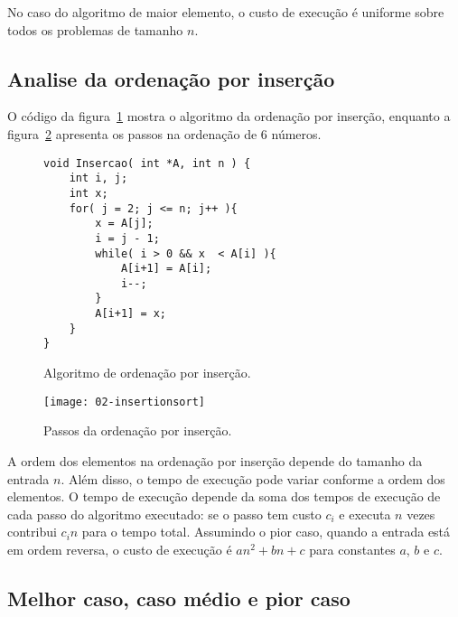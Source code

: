 No caso do algoritmo de maior elemento, o custo de execução é uniforme sobre todos os problemas 
de tamanho $n$.

\subsection{Analise da ordenação por inserção}

O código da figura~\ref{aula02:algo:insertion} mostra o algoritmo da ordenação
por inserção, enquanto a figura~\ref{aula02:fig:insertion} apresenta os passos
na ordenação de 6 números.
%
\begin{figure}[!htb]
\centering
\begin{framed}
\begin{lstlisting}
void Insercao( int *A, int n ) {
	int i, j;
	int x;
	for( j = 2; j <= n; j++ ){
		x = A[j];
		i = j - 1;
		while( i > 0 && x  < A[i] ){
			A[i+1] = A[i];
			i--;
		}
		A[i+1] = x;
	}
}
\end{lstlisting}
\end{framed}
\caption{Algoritmo de ordenação por inserção.}
\label{aula02:algo:insertion}
\end{figure}
%
\begin{figure}[ht]
\centering
\texttt{[image: 02-insertionsort]}
\caption{Passos da ordenação por inserção.}
\label{aula02:fig:insertion}
\end{figure}

A ordem dos elementos na ordenação por inserção depende do tamanho da entrada $n$. 
Além disso, o tempo de execução pode variar conforme a ordem dos elementos.
%
O tempo de execução depende da soma dos tempos de execução de cada passo do algoritmo
executado: se o passo tem custo $c_i$ e executa $n$ vezes contribui $c_i n$ para o tempo
total.
Assumindo o pior caso, quando a entrada está em ordem reversa, o custo de execução é 
$an^2 + bn +c$ para constantes $a$, $b$ e $c$.


\subsection{Melhor caso, caso médio e pior caso}

